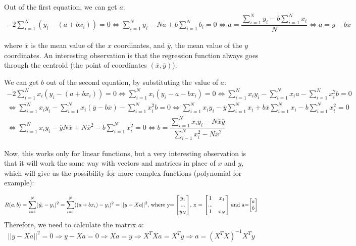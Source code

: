 \documentclass[notitlepage, 11pt]{report}
\begin{document}
		Out of the first equation, we can get $a$:
		\begin{multline*}
			-2\sum_{i=1}^{N}(y_i - (a+bx_i)) = 0 \Leftrightarrow \sum_{i=1}^{N}y_i - Na + b \sum_{i=1}^{N}b_i = 0 \Leftrightarrow
			 a = \dfrac{\sum_{i=1}^{N}y_i - b \sum_{i=1}^{N}x_i }{N} \Leftrightarrow a = \overline{y} - b \overline{x} 
		\end{multline*}
		
		where $\overline{x}$ is the mean value of the $x$ coordinates, and $\overline{y}$, the mean value of the $y$ coordinates. An interesting observation is that the regression function always goes through the centroid (the point of coordinates $(\overline{x}, \overline{y})$).
		
		We can get $b$ out of the second equation, by substituting the value of $a$:		
		\begin{multline*}
			-2\sum_{i=1}^{N} x_i(y_i - (a+bx_i)) = 0 \Leftrightarrow 		\sum_{i=1}^{N}x_i(y_i -a - bx_i) = 0 \Leftrightarrow \sum_{i=1}^{N}x_iy_i - \sum_{i=1}^{N} x_ia - \sum_{i=1}^{N} x_i^2b = 0 \\
			\Leftrightarrow \sum_{i=1}^{N} x_iy_i - \sum_{i=1}^{N}x_i(\overline{y} - b\overline{x}) - \sum_{i=1}^{N} x_i^2b = 0 \Leftrightarrow \sum_{i=1}^{N}x_iy_i - \overline{y}\sum_{i=1}^{N}x_i + b\overline{x}\sum_{i=1}^{N}x_i - b\sum_{i=1}^{N} x_i^2 = 0 \\
			\Leftrightarrow \sum_{i=1}^{N} x_iy_i - \overline{y}N\overline{x} + N\overline{x}^2 - b\sum_{i=1}^{N}x_i^2 = 0 \Leftrightarrow b = \dfrac{\sum_{i=1}^{N}x_iy_i - N \overline{x}\overline{y}}{\sum_{i-1}^{N}x_i^2 - N\overline{x}^2}
 		\end{multline*}

		Now, this works only for linear functions, but a very interesting observation is that it will work the same way with vectors and matrices in place of $x$ and $y$, which will give us the possibility for more complex functions (polynomial for example):
 			
		\begin{multline*}
			R(a, b) = \sum_{i=1}^{N}(\hat{y_{i}} - y_{i})^2 = 	\sum_{i=1}^{N}((a + bx_i) - y_i)^2 = || y - Xa||^2$, where y$= \begin{bmatrix} y_1 \\ ... \\ y_N\end{bmatrix} $, x = $\begin{bmatrix} 1 & x_1 \\ ... \\ 1 & x_N\end{bmatrix} $ and a=$\begin{bmatrix} a \\ b\end{bmatrix}
		\end{multline*}
		Therefore, we need to calculate the matrix $a$:
		\begin{equation*}
			|| y - Xa||^2 = 0 \Rightarrow y-Xa = 0 \Rightarrow Xa = y \Rightarrow X^TXa = X^Ty \Rightarrow a = (X^TX)^{-1}X^Ty
		\end{equation*}
		
\end{document}
